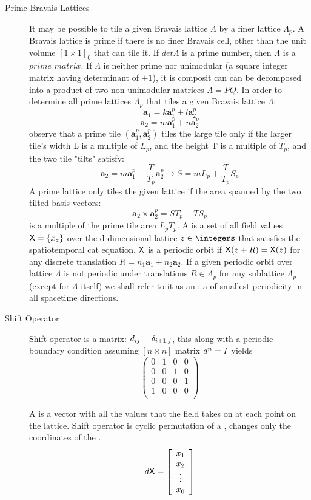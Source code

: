 \begin{description}
\begin{description}
\item[Prime Bravais Lattices]

It may be possible to tile a given Bravais lattice $\Lambda$ by a finer
lattice $\Lambda_p$. A Bravais lattice is prime if there is no finer
Bravais cell, other than the unit volume $[1\times 1]_0$ that can tile
it. If $det \Lambda$ is a prime number, then $\Lambda$ is a
$\textit{prime matrix}$. If $\Lambda$ is neither prime nor unimodular (a
square integer matrix having determinant of $\pm 1$), it is composit can
can be decomposed into a product of two non-unimodular matrices
$\Lambda=PQ$. In order to determine all prime lattices $\Lambda_p$ that
tiles a given Bravais lattice $\Lambda$:
$$\mathbf{a}_1=k\mathbf{a}_1^p+l\mathbf{a}_2^p$$
$$\mathbf{a}_2=m\mathbf{a}_1^p+n\mathbf{a}_2^p$$
observe that a prime tile $(\mathbf{a}_1^p,\mathbf{a}_2^p)$ tiles the large tile only if the larger tile's width L is a multiple of $L_p$, and the height T is a multiple of $T_p$, and the two tile "tilts" satisfy:
$$\mathbf{a}_2=m\mathbf{a}_1^p+\frac{T}{T_p}\mathbf{a}_2^p \to S=mL_p+\frac{T}{T_p}S_p $$
A prime lattice only tiles the given lattice if the area spanned by the two tilted basis vectors:
$$\mathbf{a}_2\times \mathbf{a}_2^p=ST_p-TS_p$$
is a multiple of the prime tile area $L_p T_p$. A {\lattstate} is a set
of all field values $\mathsf{X}=\{x_z\}$ over the d-dimensional lattice
$z\in\integers$ that satisfies the spatiotemporal cat equation.
{\Lattstate} $\mathsf{X}$ is a periodic orbit if $\mathsf{X}(z+R)=\mathsf{X}(z)$ for any discrete
translation $R=n_1\mathbf{a}_1+n_2\mathbf{a}_2$. If a given periodic
orbit over lattice $\Lambda$ is not periodic under translations
$R\in\Lambda_p$ for any sublattice $\Lambda_p$ (except for $\Lambda$
itself) we shall refer to it as an {\orbit}: a {\lattstate}
of smallest periodicity in all spacetime directions.

\item[Shift Operator]

Shift operator is a matrix: $d_{ij}=\delta_{i+1,j}$, this along with a periodic boundary condition assuming $[n\times n]$ matrix $d^n=I$ yields
$$\left( \begin{array}{cccc}
0&1&0&0\\
0&0&1&0\\
0&0&0&1\\
1&0&0&0\\
\end{array}\right)$$

A {\lattstate} is a vector with all the values that the field takes on at each point on the lattice. Shift operator is cyclic permutation of a {\lattstate}, changes only the coordinates of the {\lattstate}.
$$d\mathsf{X}=\left[ \begin{array}{c}
x_1\\
x_2\\
\vdots\\
x_0\\
\end{array}
\right]$$


\end{description}
\end{description}
